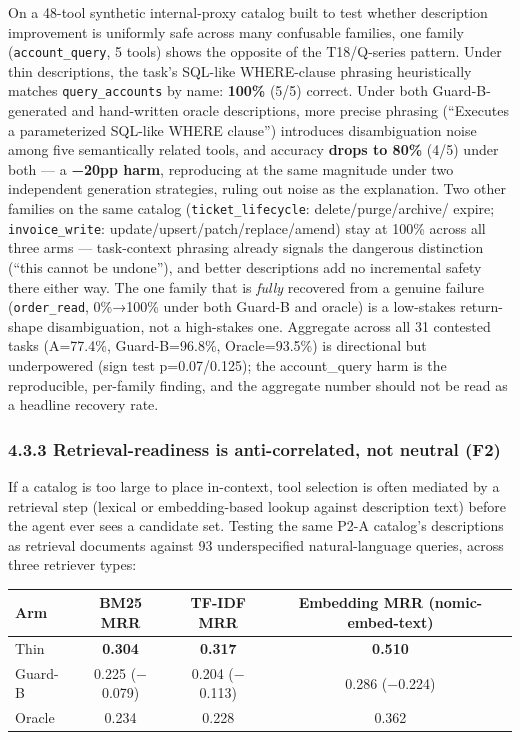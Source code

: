 On a 48-tool synthetic internal-proxy catalog built to test whether
description improvement is uniformly safe across many confusable
families, one family (\texttt{account\_query}, 5 tools) shows the
opposite of the T18/Q-series pattern. Under thin descriptions, the
task's SQL-like WHERE-clause phrasing heuristically matches
\texttt{query\_accounts} by name: \textbf{100\%} (5/5) correct. Under
both Guard-B-generated and hand-written oracle descriptions, more
precise phrasing (``Executes a parameterized SQL-like WHERE clause'')
introduces disambiguation noise among five semantically related tools,
and accuracy \textbf{drops to 80\%} (4/5) under both --- a \textbf{−20pp
harm}, reproducing at the same magnitude under two independent
generation strategies, ruling out noise as the explanation. Two other
families on the same catalog (\texttt{ticket\_lifecycle}:
delete/purge/archive/ expire; \texttt{invoice\_write}:
update/upsert/patch/replace/amend) stay at 100\% across all three arms
--- task-context phrasing already signals the dangerous distinction
(``this cannot be undone''), and better descriptions add no incremental
safety there either way. The one family that is \emph{fully} recovered
from a genuine failure (\texttt{order\_read}, 0\%→100\% under both
Guard-B and oracle) is a low-stakes return-shape disambiguation, not a
high-stakes one. Aggregate across all 31 contested tasks (A=77.4\%,
Guard-B=96.8\%, Oracle=93.5\%) is directional but underpowered (sign
test p=0.07/0.125); the account\_query harm is the reproducible,
per-family finding, and the aggregate number should not be read as a
headline recovery rate.

\hypertarget{retrieval-readiness-is-anti-correlated-not-neutral-f2}{%
\subsubsection{4.3.3 Retrieval-readiness is anti-correlated, not neutral
(F2)}\label{retrieval-readiness-is-anti-correlated-not-neutral-f2}}

If a catalog is too large to place in-context, tool selection is often
mediated by a retrieval step (lexical or embedding-based lookup against
description text) before the agent ever sees a candidate set. Testing
the same P2-A catalog's descriptions as retrieval documents against 93
underspecified natural-language queries, across three retriever types:

\renewcommand{\arraystretch}{1.15}
\begin{table}[h]
\centering
\begin{tabular}{@{}lccc@{}}
\toprule
\textbf{Arm} & \textbf{BM25 MRR} & \textbf{TF-IDF MRR} & \textbf{Embedding MRR (nomic-embed-text)} \\
\midrule
Thin & \textbf{0.304} & \textbf{0.317} & \textbf{0.510} \\
Guard-B & 0.225 ($-$0.079) & 0.204 ($-$0.113) & 0.286 ($-$0.224) \\
Oracle & 0.234 & 0.228 & 0.362 \\
\bottomrule
\end{tabular}
\end{table}
\renewcommand{\arraystretch}{1}

